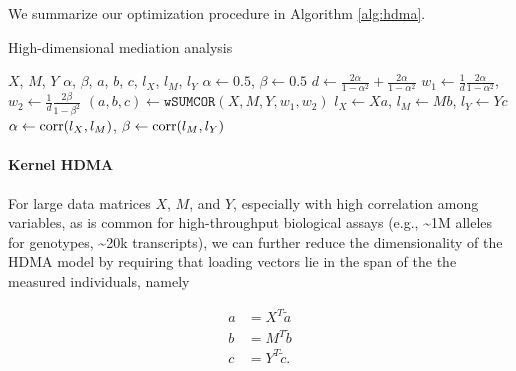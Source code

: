 \documentclass[
]{article}
\begin{document}
We summarize our optimization procedure in Algorithm \ref{alg:hdma}.

\begin{algorithm}
\caption{High-dimensional mediation analysis}\label{alg:hdma}
\begin{algorithmic}
\Require $X$, $M$, $Y$ 
\Ensure $\alpha$, $\beta$, $a$, $b$, $c$, $l_X$, $l_M$, $l_Y$ 
\State $\alpha \gets 0.5$, $\beta \gets 0.5$ 
\State $d \gets \frac{2\alpha}{1-\alpha^2} + \frac{2\alpha}{1-\alpha^2}$ 
\State $w_1 \gets \frac{1}{d}\frac{2\alpha}{1-\alpha^2}$, $w_2 \gets \frac{1}{d}\frac{2\beta}{1-\beta^2}$ 
\State $(a,b,c) \gets \texttt{wSUMCOR}(X, M, Y, w_1, w_2)$  
\State $l_X \gets Xa$, $l_M \gets Mb$, $l_Y \gets Yc$ 
\State $\alpha \gets {\rm corr}(l_X, l_M)$, $\beta \gets {\rm corr}(l_M, l_Y)$ 
\EndWhile
\end{algorithmic}
\end{algorithm}

\paragraph{Kernel HDMA}\label{kernel-hdma}

For large data matrices \(X\), \(M\), and \(Y\), especially with high
correlation among variables, as is common for high-throughput biological
assays (e.g., \textasciitilde1M alleles for genotypes,
\textasciitilde20k transcripts), we can further reduce the
dimensionality of the HDMA model by requiring that loading vectors lie
in the span of the the measured individuals, namely

\begin{align}
a &= X^T \tilde{a} \\
b &= M^T \tilde{b} \\
c &= Y^T \tilde{c}.
\end{align}
\end{document}
